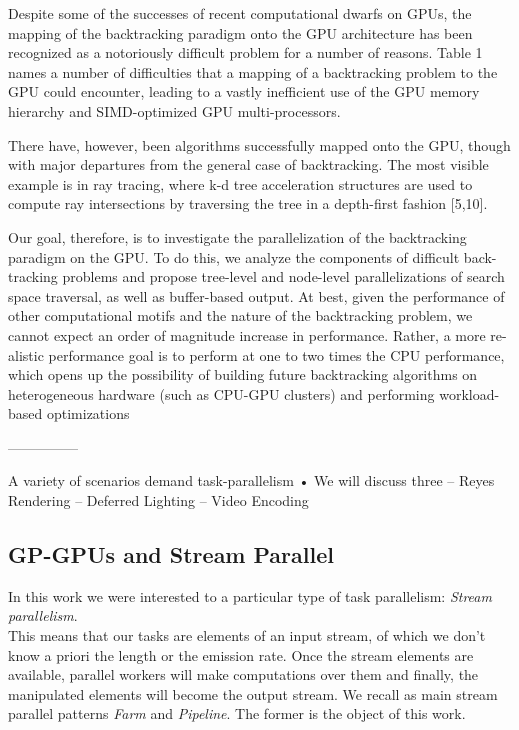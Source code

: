 		Despite some of the successes of recent computational dwarfs on GPUs, the
		mapping of the backtracking paradigm onto the GPU architecture has been
		recognized as a notoriously difficult problem for a number of reasons. Table 1
		names a number of difficulties that a mapping of a backtracking problem to the
		GPU could encounter, leading to a vastly inefficient use of the GPU memory
		hierarchy and SIMD-optimized GPU multi-processors.
		
		There have, however, been algorithms successfully mapped onto the GPU,
		though with major departures from the general case of backtracking. The most
		visible example is in ray tracing, where k-d tree acceleration structures are used
		to compute ray intersections by traversing the tree in a depth-first fashion [5,10].
		
		
		Our goal, therefore, is to investigate the parallelization of the backtracking
		paradigm on the GPU. To do this, we analyze the components of difficult back-
		tracking problems and propose tree-level and node-level parallelizations of search
		space traversal, as well as buffer-based output. At best, given the performance
		of other computational motifs and the nature of the backtracking problem, we
		cannot expect an order of magnitude increase in performance. Rather, a more re-
		alistic performance goal is to perform at one to two times the CPU performance,
		which opens up the possibility of building future backtracking algorithms on
		heterogeneous hardware (such as CPU-GPU clusters) and performing workload-
		based optimizations
		\cite{backtrack}
 	
 	---------------
 	
 	
 	A variety of scenarios demand task-parallelism
 	• We will discuss three
 	– Reyes Rendering
 	– Deferred Lighting
 	– Video Encoding
 	
 	
 	
 	
 	
 	
 	
 	
 	
 	
 	
 	
 	
 	
 	
 	
 	
 	
 	
 	 
	
	\subsection{GP-GPUs and Stream Parallel}
		In this work we were interested to a particular type of task parallelism: \textit{Stream parallelism}.\\
		This means that our tasks are elements of an input stream, of which we don't know a priori the length or the emission rate.
		Once the stream elements are available, parallel workers will make computations over them and finally, the manipulated elements will become the output stream.
		We recall as main stream parallel patterns \textit{Farm} and \textit{Pipeline}. The former is the object of this work.\\
		
